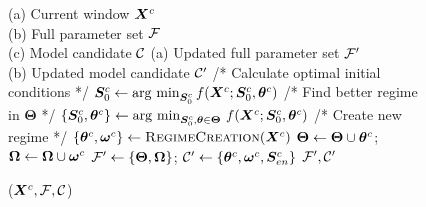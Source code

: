 \begin{figure}[!h]
\vspace{-0.0ex}
\begin{algorithm}[H]
    \normalsize
    \caption{\modelestimator($\bm{X}^c, \mathcal{F}, \mathcal{C}$)}
    \label{alg:estimator}
    \begin{algorithmic}[1]
        \hspace{0.0mm}  (a) Current window $\bm{X}^c$ \\
        \hspace{9.5mm} (b) Full parameter set $\mathcal{F}$ \\
        \hspace{9.68mm} (c) Model candidate $\mathcal{C}$
        \hspace{0.0mm}  (a) Updated full parameter set $\mathcal{F}'$ \\
        \hspace{11.8mm} (b) Updated model candidate $\mathcal{C}'$
        \STATE /* Calculate optimal initial conditions */
        \STATE $\bm{S}_{0}^c \leftarrow \mathop{\rm arg~min}_{\bm{S}_{0}^c} f(\bm{X}^c; \bm{S}_{0}^c, \boldsymbol{\theta}^c)$
            \STATE /* Find better regime in $\bm{\Theta}$ */
            \STATE $\{ \bm{S}_{0}^c, \boldsymbol{\theta}^c \} \leftarrow \mathop{\rm arg~min}_{\bm{S}_{0}^c, \boldsymbol{\theta} \in \boldsymbol{\Theta}} \,f(\bm{X}^c; \bm{S}_{0}^c, \boldsymbol{\theta}^c)$
                \STATE /* Create new regime */
                \STATE $\{ \boldsymbol{\theta}^c, \boldsymbol{\omega}^c \} \leftarrow \textsc{RegimeCreation}(\bm{X}^c)$
                \STATE $\boldsymbol{\Theta} \leftarrow \boldsymbol{\Theta} \cup \boldsymbol{\theta}^c$; $\boldsymbol{\Omega} \leftarrow \boldsymbol{\Omega} \cup \boldsymbol{\omega}^c$
            \ENDIF
        \ENDIF
        \STATE $\mathcal{F}' \leftarrow \{\boldsymbol{\Theta}, \boldsymbol{\Omega}\}$; $\mathcal{C}' \leftarrow \{\boldsymbol{\theta}^c, \boldsymbol{\omega}^c, \bm{S}_{en}^c\}$
        \RETURN $\mathcal{F}', \mathcal{C}'$
    \end{algorithmic}
\end{algorithm}
\vspace{-3.3em}
\end{figure}